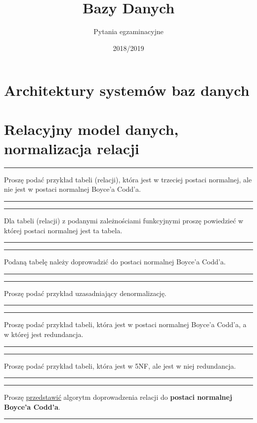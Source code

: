 \documentclass[a5paper,6pt]{article}
\title{Bazy Danych}
\author{Pytania egzaminacyjne}
\date{2018/2019}
\newcommand{\horrule}[1]{\rule{\linewidth}{#1}}
\begin{document}
    \maketitle
    \tableofcontents
    \pagebreak

    \section{Architektury systemów baz danych} %
    \label{sec:architektury_systemow}


    \section{Relacyjny model danych, normalizacja relacji} %
    \label{sec:relacyjny_model_danych_normalizacja_relacji}

    \horrule{0.5pt}
    Proszę podać przykład tabeli (relacji), która jest w trzeciej postaci
    normalnej, ale nie jest w postaci normalnej Boyce’a Codd’a.\\
    \horrule{0.5pt}

    \horrule{0.5pt}
    Dla tabeli (relacji) z podanymi zależnościami funkcyjnymi proszę powiedzieć w której postaci normalnej jest ta tabela.\\
    \horrule{0.5pt}

    \horrule{0.5pt}
    Podaną tabelę należy doprowadzić do postaci normalnej Boyce’a Codd’a.\\
    \horrule{0.5pt}

    \horrule{0.5pt}
    Proszę podać przykład uzasadniający denormalizację.\\
    \horrule{0.5pt}

    \horrule{0.5pt}
    Proszę podać przykład tabeli, która jest w postaci normalnej Boyce’a Codd’a,
    a w której jest redundancja.\\
    \horrule{0.5pt}

    \horrule{0.5pt}
    Proszę podać przykład tabeli, która jest w 5NF, ale jest w niej
    redundancja.\\
    \horrule{0.5pt}

    \horrule{0.5pt}
    Proszę \underline{przedstawić} algorytm doprowadzenia relacji do
    \textbf{postaci normalnej Boyce’a Codd’a}.\\
    \horrule{0.5pt}
\end{document}

